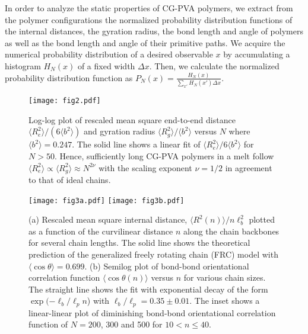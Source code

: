 \documentclass[pre,showpacs,notitlepage,twocolumn]{revtex4-1}
\begin{document}
 
 In order to analyze the  static properties  of CG-PVA  polymers,  we  extract from the polymer  configurations  the normalized probability distribution functions of the internal distances, the gyration radius, the bond  length and angle of 
  polymers as well  as the bond  length and angle of their primitive paths.
We  acquire the numerical  probability distribution  of a desired observable $x$  by accumulating a histogram  $H_N(x)$ of a fixed width $\Delta x$. Then, we calculate the normalized  probability distribution function as $P_N(x)=\frac{H_N(x)}{\sum_{x'} H_N(x') \Delta x}$. 




\begin{figure}[t]
\texttt{[image: fig2.pdf]}
\caption{Log-log plot of rescaled   mean square end-to-end distance $\langle R_e^2 \rangle /(6 \langle b^2 \rangle)$ and gyration radius $\langle R_g^2\rangle/ \langle b^2 \rangle $  versus $N$ where $\langle b^2 \rangle=0.247$. 
The solid line shows a linear fit of $\langle R_e^2\rangle/ 6 \langle  b^2 \rangle $ for $N > 50$. Hence, sufficiently long CG-PVA polymers in a melt  follow  $\langle R_e^2\rangle \propto \langle R_g^2\rangle\approx  N^{2\nu}$  
 with the scaling  exponent $\nu=1/2$ in agreement to that of ideal chains.
}
\label{fig2} 
\end{figure}
%
\begin{figure*}[ht]
\texttt{[image: fig3a.pdf]}
\texttt{[image: fig3b.pdf]}
\caption{(a) Rescaled mean square internal distance, $\langle R^2(n) \rangle/ n \ell_{b}^2  $  plotted as a
function of the  curvilinear distance  $n$ along the chain backbones for several chain lengths. The solid line shows the theoretical prediction of  the generalized freely rotating
chain (FRC) model with $ \langle \cos \theta \rangle=0.699 $. (b)  Semilog plot of bond-bond orientational correlation function $ \langle \cos \theta  (n) \rangle$ versus $n$ for various chain sizes.
The straight line shows the fit with exponential decay of the form $\exp(-\ell_b/\ell_p n$) with $\ell_b/\ell_p=0.35 \pm 0.01$.  The inset shows a linear-linear  plot of diminishing bond-bond orientational correlation function of
$N=200$, 300 and 500 for $ 10 < n \le 40$.}
\label{fig3} 
\end{figure*}
%
\end{document}
